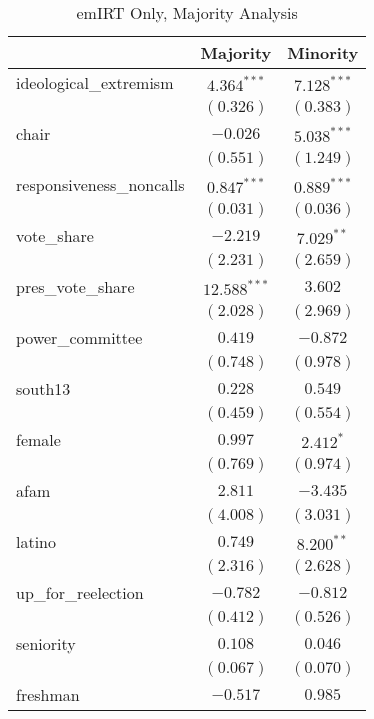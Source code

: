 \documentclass[12pt]{article}
\begin{document}
\begin{table}
	\begin{center}
	\caption{emIRT Only, Majority Analysis}
		\begin{tabular}{l c c }
			\hline
			& Majority & Minority \\
			\hline
			ideological\_extremism   & $4.364^{***}$  & $7.128^{***}$ \\
			& $(0.326)$      & $(0.383)$     \\
			chair                    & $-0.026$       & $5.038^{***}$ \\
			& $(0.551)$      & $(1.249)$     \\
			responsiveness\_noncalls & $0.847^{***}$  & $0.889^{***}$ \\
			& $(0.031)$      & $(0.036)$     \\
			vote\_share              & $-2.219$       & $7.029^{**}$  \\
			& $(2.231)$      & $(2.659)$     \\
			pres\_vote\_share        & $12.588^{***}$ & $3.602$       \\
			& $(2.028)$      & $(2.969)$     \\
			power\_committee         & $0.419$        & $-0.872$      \\
			& $(0.748)$      & $(0.978)$     \\
			south13                  & $0.228$        & $0.549$       \\
			& $(0.459)$      & $(0.554)$     \\
			female                   & $0.997$        & $2.412^{*}$   \\
			& $(0.769)$      & $(0.974)$     \\
			afam                     & $2.811$        & $-3.435$      \\
			& $(4.008)$      & $(3.031)$     \\
			latino                   & $0.749$        & $8.200^{**}$  \\
			& $(2.316)$      & $(2.628)$     \\
			up\_for\_reelection      & $-0.782$       & $-0.812$      \\
			& $(0.412)$      & $(0.526)$     \\
			seniority                & $0.108$        & $0.046$       \\
			& $(0.067)$      & $(0.070)$     \\
			freshman                 & $-0.517$       & $0.985$       \\

\end{tabular}
\end{center}
\end{table}
\end{document}
